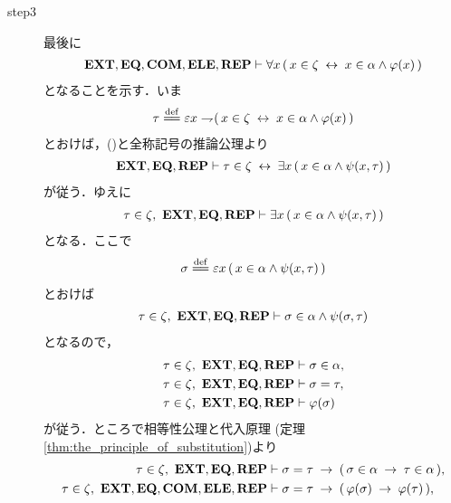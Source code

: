 \begin{sketch}
\begin{description}
			\item[step3]
				最後に
				\begin{align}
					\mbox{{\bf EXT}},\mbox{{\bf EQ}},\mbox{\bf COM},\mbox{{\bf ELE}},\mbox{{\bf REP}} \vdash \forall x\,
					(\, x \in \zeta \hspace{0.25em}\leftrightarrow\hspace{0.25em} x \in \alpha \wedge \varphi(x)\, )
					\label{fom:thm_axiom_of_separation_8}
				\end{align}
				となることを示す．いま
				\begin{align}
					\tau \defeq \varepsilon x \negation
					(\, x \in \zeta \lrarrow x \in \alpha \wedge \varphi(x)\, )
				\end{align}
				とおけば，()と全称記号の推論公理より
				\begin{align}
					\mbox{{\bf EXT}},\mbox{{\bf EQ}},\mbox{{\bf REP}} \vdash 
					\tau \in \zeta \hspace{0.25em}\leftrightarrow\hspace{0.25em} \exists x\, (\, x \in \alpha \wedge 
					\psi(x,\tau)\, )
					\label{fom:thm_axiom_of_separation_5}
				\end{align}
				が従う．ゆえに
				\begin{align}
					\tau \in \zeta,\ \mbox{{\bf EXT}},\mbox{{\bf EQ}},\mbox{{\bf REP}} \vdash
					\exists x\, (\, x \in \alpha \wedge \psi(x,\tau)\, )
				\end{align}
				となる．ここで
				\begin{align}
					\sigma \defeq \varepsilon x\, (\, x \in \alpha \wedge
					\psi(x,\tau)\, )
				\end{align}
				とおけば
				\begin{align}
					\tau \in \zeta,\ \mbox{{\bf EXT}},\mbox{{\bf EQ}},\mbox{{\bf REP}} \vdash
					\sigma \in \alpha \wedge \psi(\sigma,\tau)
				\end{align}
				となるので，
				\begin{align}
					\tau \in \zeta,\ \mbox{{\bf EXT}},\mbox{{\bf EQ}},\mbox{{\bf REP}} &\vdash \sigma \in \alpha, \\
					\tau \in \zeta,\ \mbox{{\bf EXT}},\mbox{{\bf EQ}},\mbox{{\bf REP}} &\vdash \sigma = \tau, \\
					\tau \in \zeta,\ \mbox{{\bf EXT}},\mbox{{\bf EQ}},\mbox{{\bf REP}} &\vdash \varphi(\sigma)
				\end{align}
				が従う．ところで相等性公理と代入原理
				(定理\ref{thm:the_principle_of_substitution})より
				\begin{align}
					\tau \in \zeta,\ \EXTAX,\EQAX,\REPAX &\vdash 
						\sigma = \tau \rarrow (\, \sigma \in \alpha \rarrow
						\tau \in \alpha\, ), \\
					\tau \in \zeta,\ \EXTAX,\EQAX,\COMAX,\ELEAX,\REPAX &\vdash
						\sigma = \tau \rarrow (\, \varphi(\sigma) \rarrow
						\varphi(\tau)\, ), 
						\label{fom:thm_axiom_of_separation_9} \\

\end{align}
\end{description}
\end{sketch}
